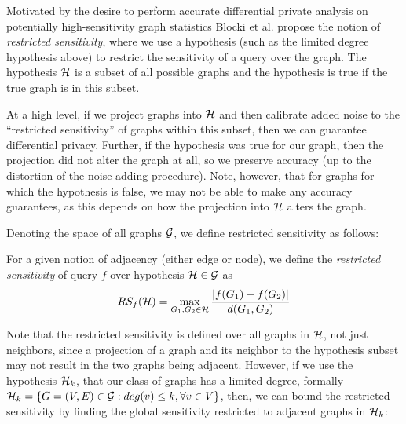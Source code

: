 Motivated by the desire to perform accurate differential private analysis on potentially high-sensitivity graph statistics Blocki et al. \cite{BBDS13} propose the notion of \emph{restricted sensitivity}, where we use a hypothesis (such as the limited degree hypothesis above) to restrict the sensitivity of a query over the graph. The hypothesis $\mathcal{H}$ is a subset of all possible graphs and the hypothesis is true if the true graph is in this subset. 

At a high level, if we project graphs into $\mathcal{H}$ and then calibrate added noise to the ``restricted sensitivity'' of graphs within this subset, then we can guarantee differential privacy. Further, if the hypothesis was true for our graph, then the projection did not alter the graph at all, so we preserve accuracy (up to the distortion of the noise-adding procedure). Note, however, that for graphs for which the hypothesis is false, we may not be able to make any accuracy guarantees, as this depends on how the projection into $\mathcal{H}$ alters the graph. 

Denoting the space of all graphs $\mathcal{G}$, we define restricted sensitivity as follows:

\begin{definition}
\label{def:restricted-sensitivity}
For a given notion of adjacency (either edge or node), we define the \emph{restricted sensitivity} of query $f$ over hypothesis $\mathcal{H} \in \mathcal{G}$ as
$$RS_f(\mathcal{H}) = \max_{G_1, G_2 \in \mathcal{H}} \frac{|f(G_1) - f(G_2)|}{d(G_1, G_2)}$$
\end{definition}

Note that the restricted sensitivity is defined over all graphs in $\mathcal{H}$, not just neighbors, since a projection of a graph and its neighbor to the hypothesis subset may not result in the two graphs being adjacent. However, if we use the hypothesis $\mathcal{H}_k$, that our class of graphs has a limited degree, formally $\mathcal{H}_k = \{G = (V, E) \in \mathcal{G} : deg(v) \leq k, \forall v \in V \}$, then, we can bound the restricted sensitivity by finding the global sensitivity restricted to adjacent graphs in $\mathcal{H}_k$:


